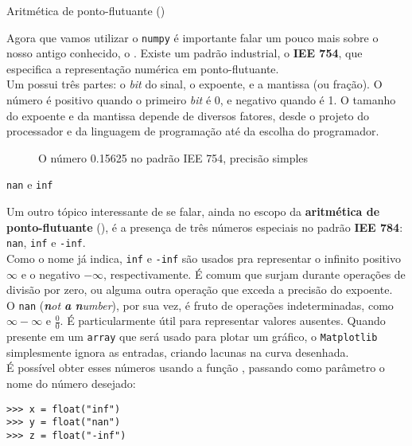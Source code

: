 \documentclass[12pt]{article}
\begin{document}
	\begin{interlude}{Aritmética de ponto-flutuante ()}
	
	Agora que vamos utilizar o \texttt{numpy} é importante falar um pouco mais sobre o nosso antigo conhecido, o . Existe um padrão industrial, o \textbf{IEE 754}, que especifica a representação numérica em ponto-flutuante.\\
	
	Um  possui três partes:	o \textit{bit} do sinal, o expoente, e a mantissa (ou fração). O número é positivo quando o primeiro \textit{bit} é 0, e negativo quando é 1. O tamanho do expoente e da mantissa depende de diversos fatores, desde o projeto do processador e da linguagem de programação até da escolha do programador.
	
	\begin{figure}[H]
	\centering
	\small
	  
	\caption{O número 0.15625 no padrão IEE 754, precisão simples}
	\end{figure}
	
	\end{interlude}
	
	
	
	
	\begin{interlude}{\texttt{nan} e \texttt{inf}}
	
	Um outro tópico interessante de se falar, ainda no escopo da \textbf{aritmética de ponto-flutuante} (), é a presença de três números especiais no padrão \textbf{IEE 784}: \texttt{nan}, \texttt{inf} e \texttt{-inf}.\\
	
	Como o nome já indica, \texttt{inf} e \texttt{-inf} são usados pra representar o infinito positivo $\infty$ e o negativo $-\infty$, respectivamente. É comum que surjam durante operações de divisão por zero, ou alguma outra operação que exceda a precisão do expoente.\\
	
	O \texttt{nan} (\textit{\textbf{n}ot \textbf{a} \textbf{n}umber}), por sua vez, é fruto de operações indeterminadas, como $\infty - \infty$ e $\frac{0}{0}$. É particularmente útil para representar valores ausentes. Quando presente em um \texttt{array} que será usado para plotar um gráfico, o \texttt{Matplotlib} simplesmente ignora as entradas, criando lacunas na curva desenhada.\\
	
	É possível obter esses números usando a função , passando como parâmetro o nome do número desejado:
	
	\begin{lstlisting}[caption='\texttt{nan} e \texttt{inf}']
>>> x = float("inf")
>>> y = float("nan")
>>> z = float("-inf")
	\end{lstlisting}
	
	
	
	
	\end{interlude}
	
\end{document}
